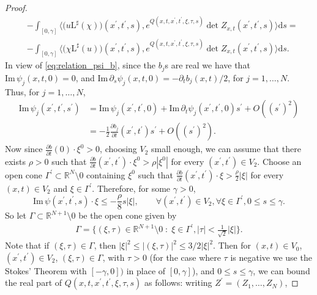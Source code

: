 \documentclass[11pt]{amsart}
\renewcommand{\Im}{\mathrm{Im}\,}
\theoremstyle{definition}
\theoremstyle{remark}
\theoremstyle{plain}
\begin{document}
\begin{proof}
\begin{align}
	& - \int_{[0, \gamma]} \bigg\langle \big(u\mathrm{L}^\sharp(\chi)\big)(x^\prime, t^\prime, s),  e^{Q(x,t,x^\prime, t^\prime, \xi,\tau, s)}  \det Z_{x,t}(x^\prime,t^\prime, s) \bigg\rangle \mathrm{d} s = \\ \nonumber
	& - \int_{[0, \gamma]} \bigg\langle \big(\chi\mathrm{L}^\sharp(u)\big)(x^\prime, t^\prime, s),  e^{Q(x,t,x^\prime, t^\prime, \xi,\tau, s)}  \det Z_{x,t}(x^\prime,t^\prime, s) \bigg\rangle \mathrm{d} s. 
\end{align}
%
In view of \eqref{eq:relation_psi_b}, since the $b_j$s are real we have that $\Im \psi_j(x,t,0) = 0$, and $\Im \partial_s \psi_j(x,t,0) = - \partial_t b_j(x,t)/2$, for $j = 1, \dots, N$. Thus, for $j = 1, \dots, N$,
%
\begin{align*}
	\Im \psi_j(x^\prime, t^\prime, s^\prime) & = \Im \psi_j(x^\prime, t^\prime, 0) + \Im \partial_t \psi_j(x^\prime, t^\prime, 0) s^\prime + O((s^\prime)^2) \\
	& = -\frac{1}{2}\frac{\partial b_j}{\partial t}(x^\prime, t^\prime) s^\prime + O((s^\prime)^2).
\end{align*}
%
Now since $\frac{\partial b}{\partial t}(0) \cdot \xi^0 > 0$, choosing $V_2$ small enough,
we can assume that there exists $\rho >0$ such that
$\frac{\partial b}{\partial t}(x^\prime, t^\prime) \cdot \xi^0 > \rho |\xi^0|$ 
for every $(x^\prime, t^\prime) \in V_2$. 
Choose an open cone $\Gamma^\prime \subset \mathbb{R}^N \setminus 0$  containing $\xi^0$ such that $\frac{\partial b}{\partial t}(x^\prime, t^\prime) \cdot \xi > \frac{\rho}{2} |\xi|$ for every $(x,t)\in V_2$ and $\xi \in \Gamma^\prime$. Therefore, for some $\gamma > 0$,
%
\begin{equation*}
	\Im \psi(x^\prime, t^\prime, s) \cdot \xi \leq - \frac{\rho}{8} s |\xi|, \qquad \forall (x^\prime, t^\prime) \in V_2, \forall \xi \in \Gamma^\prime, 0 \leq s \leq \gamma.
\end{equation*}
%
So let $\Gamma \subset \mathbb{R}^{N + 1} \setminus 0$ be the open cone given by
%
\begin{align*}
	\Gamma = \{ (\xi, \tau) \in \mathbb{R}^{N + 1} \setminus 0 \; : \; \xi \in \Gamma^\prime, |\tau| < \frac{1}{\sqrt{2}} |\xi| \}.
\end{align*}
%
Note that if $(\xi,\tau) \in \Gamma$, then $|\xi|^2 \leq |(\xi,\tau)|^2 \leq 3/2|\xi|^2$.
%
Then for $(x,t) \in V_0$, $(x^\prime, t^\prime) \in V_2$, $(\xi, \tau) \in \Gamma$, with $\tau > 0$ (for the case where $\tau$ is negative we use the Stokes' Theorem with $[-\gamma, 0])$ in place of $[0, \gamma]$), and $0 \leq s \leq \gamma$, we can bound the real part of $Q(x,t, x^\prime, t^\prime, \xi, \tau, s)$ as follows: writing $Z^\prime = (Z_1, \dots, Z_N)$,

\end{proof}
\end{document}
